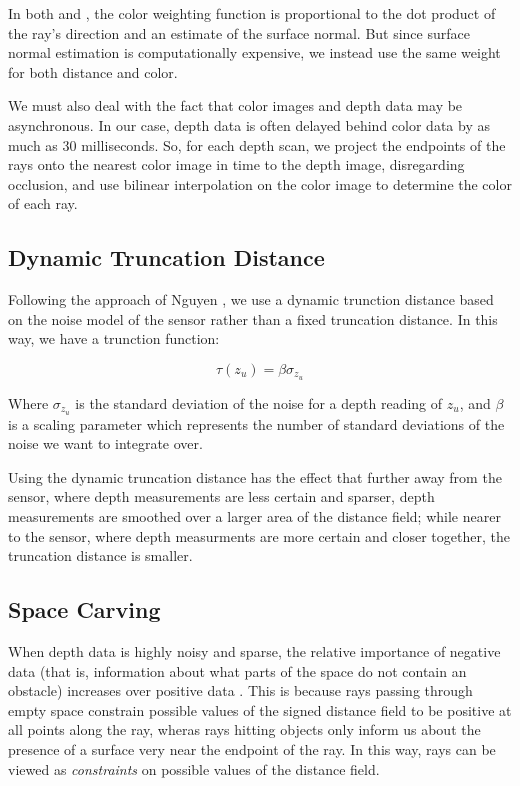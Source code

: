\documentclass[10pt,twocolumn,letterpaper]{article}
\begin{document}
In both \cite{Bylow2013} and \cite{Whelan2013}, the color weighting function is
proportional to the dot product of the ray's direction and an estimate of the
surface normal. But since surface normal estimation is computationally
expensive, we instead use the same weight for both distance and color.

We must also deal with the fact that color images and depth data may be
asynchronous. In our case, depth data is often delayed behind color data by as
much as 30 milliseconds. So, for each depth scan, we project the endpoints of
the rays onto the nearest color image in time to the depth image, disregarding
occlusion, and use bilinear interpolation on the color image to determine the
color of each ray.

\subsection{Dynamic Truncation Distance}
Following the approach of Nguyen \etal\cite{Nguyen2012}, we use a dynamic
trunction distance based on the noise model of the sensor rather than a fixed
truncation distance. In this way, we have a trunction function:

\begin{equation} \tau(z_u) = \beta\sigma_{z_u} \end{equation}

Where $\sigma_{z_u}$ is the standard deviation of the noise for a depth reading
of $z_u$, and $\beta$ is a scaling parameter which represents the number of
standard deviations of the noise we want to integrate over.

Using the dynamic truncation distance has the effect that further away from the
sensor, where depth measurements are less certain and sparser, depth
measurements are smoothed over a larger area of the distance field; while nearer
to the sensor, where depth measurments are more certain and closer together, the
truncation distance is smaller.

\subsection{Space Carving}
\label{section:carving}
When depth data is highly noisy and sparse, the relative importance of negative
data (that is, information about what parts of the space do not contain an
obstacle) increases over positive data \cite{Klingensmith2014}. This is because
rays passing through empty space constrain possible values of the signed
distance field to be positive at all points along the ray, wheras rays hitting
objects only inform us about the presence of a surface very near the endpoint of
the ray. In this way, rays can be viewed as \textit{constraints} on possible
values of the distance field. 
\end{document}
